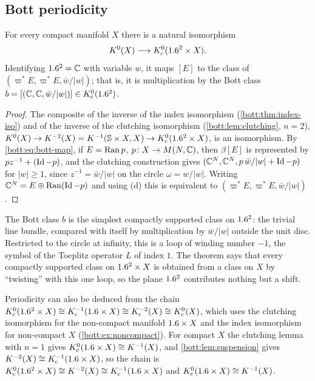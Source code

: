 \subsection{Bott periodicity}
\begin{theorem}\label{bott:thm:bott}
  For every compact manifold $X$ there is a natural isomorphism
  \begin{equation*}
    K^0(X)\longrightarrow K_{\mathrm{c}}^0(1.6^2\times X).
  \end{equation*}
  Identifying $1.6^2=\mathbb{C}$ with variable $w$, it maps $[E]$ to the class of
  $(\varpi^*E,\varpi^*E,\bar w/|w|)$; that is, it is multiplication by the Bott class
  $b=[(\mathbb{C},\mathbb{C},\bar w/|w|)]\in K_{\mathrm{c}}^0(1.6^2)$.
\end{theorem}
\begin{proof}
  The composite of the inverse of the index isomorphism (\cref{bott:thm:index-iso}) and of
  the inverse of the clutching isomorphism (\cref{bott:lem:clutching}, $n=2$),
  $K^0(X)\to K^{-2}(X)=K^{-1}(\mathbb{S}\times X,X)\to K_{\mathrm{c}}^0(1.6^2\times X)$, is an isomorphism. By
  \eqref{bott:eq:bott-map}, if $E=\operatorname{Ran} p$, $p\colon X\to M(N,\mathbb{C})$, then $\beta[E]$ is
  represented by $pz^{-1}+(\operatorname{Id}-p)$, and the clutching construction gives
  $(\mathbb{C}^N,\mathbb{C}^N,p\,\bar w/|w|+\operatorname{Id}-p)$ for $|w|\ge1$, since $z^{-1}=\bar w/|w|$ on the circle
  $\omega=w/|w|$. Writing $\mathbb{C}^N=E\oplus\operatorname{Ran}(\operatorname{Id}-p)$ and using (d) this is equivalent to
  $(\varpi^*E,\varpi^*E,\bar w/|w|)$.
\end{proof}

\begin{discussion}
  The Bott class $b$ is the simplest compactly supported class on $1.6^2$: the
  trivial line bundle, compared with itself by multiplication by $\bar w/|w|$
  outside the unit disc. Restricted to the circle at infinity, this is a loop of
  winding number $-1$, the symbol of the Toeplitz operator $L$ of index $1$.
  The theorem says that every compactly supported class on $1.6^2\times X$ is
  obtained from a class on $X$ by ``twisting'' with this one loop, so the plane
  $1.6^2$ contributes nothing but a shift.
\end{discussion}

\begin{remark}
  Periodicity can also be deduced from the chain
  $K_{\mathrm{c}}^0(1.6^2\times X)\cong K_{\mathrm{c}}^{-1}(1.6\times X)\cong K_{\mathrm{c}}^{-2}(X)\cong K_{\mathrm{c}}^0(X)$, which uses the
  clutching isomorphism for the non-compact manifold $1.6\times X$ and the index isomorphism
  for non-compact $X$ (\cref{bott:ex:noncompact}). For compact $X$ the clutching lemma with
  $n=1$ gives $K_{\mathrm{c}}^0(1.6\times X)\cong K^{-1}(X)$, and \cref{bott:lem:suspension} gives
  $K^{-2}(X)\cong K_{\mathrm{c}}^{-1}(1.6\times X)$, so the chain is
  $K_{\mathrm{c}}^0(1.6^2\times X)\cong K^{-2}(X)\cong K_{\mathrm{c}}^{-1}(1.6\times X)$ and
  $K_{\mathrm{c}}^0(1.6\times X)\cong K^{-1}(X)$.
\end{remark}

